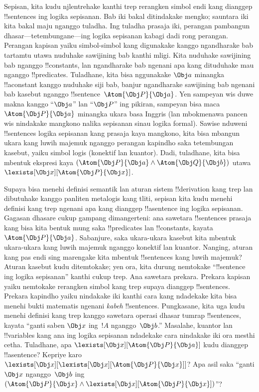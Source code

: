 \documentclass[../../../include/open-logic-section]{subfiles}
\begin{document}


Sepisan, kita kudu njlentrehake kanthi trep rerangken simbol endi kang
dianggep !!{sentence}s ing logika sepisanan. Bab iki bakal ditindakake
mengko; sauntara iki kita bakal maju nganggo tuladha. Ing tuladha prasaja iki, perangan pambangun dhasar---tetembungane---ing logika sepisanan kabagi dadi rong perangan.
Perangan kapisan yaiku simbol-simbol kang digunakake kanggo ngandharake
bab tartamtu utawa nuduhake sawijining bab kanthi mligi. Kita nuduhake
sawijining bab nganggo !!{constant}s, lan ngandharake bab ngenani apa
kang dituduhake mau nganggo !!{predicate}s. Tuladhane, kita bisa
nggunakake $\Obj a$ minangka !!a{constant} kanggo nuduhake siji bab,
banjur ngandharake sawijining bab ngenani bab kasebut nganggo
!!{sentence}~$\Atom{\Obj P}{\Obj a}$. Yen sampeyan wis duwe makna kanggo
``$\Obj a$'' lan ``$\Obj P$'' ing pikiran, sampeyan bisa maca
$\Atom{\Obj P}{\Obj a}$ minangka ukara basa Inggris (lan mbokmenawa
pancen wis nindakake mangkono nalika sepisanan sinau logika formal).
Sawise nduweni !!{sentence}s logika sepisanan kang prasaja kaya
mangkono, kita bisa mbangun ukara kang luwih majemuk nganggo perangan
kapindho saka tetembungan kasebut, yaiku simbol logis (konektif lan
kuantor). Dadi, tuladhane, kita bisa mbentuk ekspresi kaya
$(\Atom{\Obj P}{\Obj a} \land \Atom{\Obj Q}{\Obj b})$
utawa~$\lexists[\Obj x][\Atom{\Obj P}{\Obj x}]$.

Supaya bisa menehi definisi semantik lan aturan sistem !!{derivation}
kang trep lan dibutuhake kanggo panliten metalogis kang tliti, sepisan
kita kudu menehi definisi kang trep ngenani apa kang dianggep
!!a{sentence} ing logika sepisanan. Gagasan dhasare cukup gampang
dimangerteni: ana sawetara !!{sentence}s prasaja kang bisa kita bentuk
mung saka !!{predicate}s lan !!{constant}s, kayata~$\Atom{\Obj P}{\Obj
a}$. Sabanjure, saka ukara-ukara kasebut kita mbentuk ukara-ukara kang
luwih majemuk nganggo konektif lan kuantor. Nanging, aturan kang
pas endi sing marengake kita mbentuk !!{sentence}s kang luwih majemuk?
Aturan kasebut kudu ditemtokake; yen ora, kita durung nemtokake
``!!{sentence} ing logika sepisanan'' kanthi cukup trep. Ana sawetara
prekara. Prekara kapisan yaiku nemtokake rerangken simbol kang trep
supaya dianggep !!{sentence}s. Prekara kapindho yaiku nindakake iki
kanthi cara kang ndadekake kita bisa menehi bukti matematis ngenani
\emph{kabeh} !!{sentence}s. Pungkasane, kita uga kudu menehi definisi
kang trep kanggo sawetara operasi dhasar tumrap !!{sentence}s, kayata
``ganti saben $\Obj x$ ing~$!A$ nganggo~$\Obj b$.'' Masalahe, kuantor
lan !!{variable}s kang ana ing logika sepisanan ndadekake cara
nindakake iki ora mesthi cetha. Tuladhane, apa $\lexists[\Obj
x][\Atom{\Obj P}{\Obj a}]$ kudu dianggep !!a{sentence}? Kepriye karo
$\lexists[\Obj x][\lexists[\Obj x][\Atom{\Obj P}{\Obj x}]]$? Apa asil
saka ``ganti $\Obj x$ nganggo~$\Obj b$ ing $(\Atom{\Obj
P}{\Obj x} \land \lexists[\Obj x][\Atom{\Obj P}{\Obj x}])$''?
\end{document}
